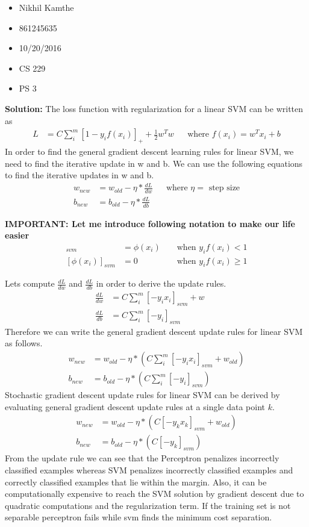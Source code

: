 \documentclass[10pt]{article}
\begin{document}
\hrulefill
\begin{itemize}
	\item Nikhil Kamthe
	\item 861245635
	\item 10/20/2016
	\item CS 229
	\item PS 3
\end{itemize}
\hrulefill

\textbf{Solution:} The loss function with regularization for a linear SVM can be written as
\begin{align*}
L &= C \sum_{i}^{m} [1-y_{i}f(x_{i})]_{+} + \frac{1}{2} w^Tw && \text{where }f(x_{i}) = w^T x_{i} + b
\end{align*}
In order to find the general gradient descent learning rules for linear SVM, we need to find the iterative update in w and b. We can use the following equations to find the iterative updates in w and b.
\begin{align*}
w_{new} &= w_{old} - \eta*\frac{dL}{dw} && \text{where $\eta=$ step size}\\
b_{new} &= b_{old} - \eta*\frac{dL}{db}
\end{align*}
\hrulefill

\textbf{IMPORTANT: Let me introduce following notation to make our life easier}
\begin{align*}
[\phi(x_{i})]_{svm} &= \phi(x_{i}) && \text{ when }y_{i}f(x_{i})<1\\
[\phi(x_{i})]_{svm} &= 0 && \text{ when }y_{i}f(x_{i})\ge 1
\end{align*}

\hrulefill

Lets compute $\frac{dL}{dw}$ and $\frac{dL}{db}$ in order to derive the update rules.
\begin{align*}
\frac{dL}{dw} &= C \sum_{i}^{m} [-y_{i}x_{i}]_{svm} + w && \\
\frac{dL}{db} &= C \sum_{i}^{m} [-y_{i}]_{svm}
\end{align*}
Therefore  we can write the general gradient descent update rules for linear SVM as follows.
\begin{align*}
w_{new} &= w_{old} - \eta*(C \sum_{i}^{m} [-y_{i}x_{i}]_{svm} + w_{old})\\
b_{new} &= b_{old} - \eta*(C \sum_{i}^{m} [-y_{i}]_{svm})
\end{align*}
Stochastic gradient descent update rules for linear SVM can be derived by evaluating general gradient descent update rules at a single data point $k$.
\begin{align*}
w_{new} &= w_{old} - \eta*(C [-y_{k}x_{k}]_{svm} + w_{old})\\
b_{new} &= b_{old} - \eta*(C [-y_{k}]_{svm})
\end{align*}
From the update rule we can see that the Perceptron penalizes incorrectly classified examples whereas SVM penalizes incorrectly classified examples and correctly classified examples that lie within the margin. Also, it can be computationally expensive to reach the SVM solution by gradient descent due to quadratic computations and the regularization term. If the training set is not separable perceptron fails while svm finds the minimum cost separation.

\hrulefill
\end{document}
